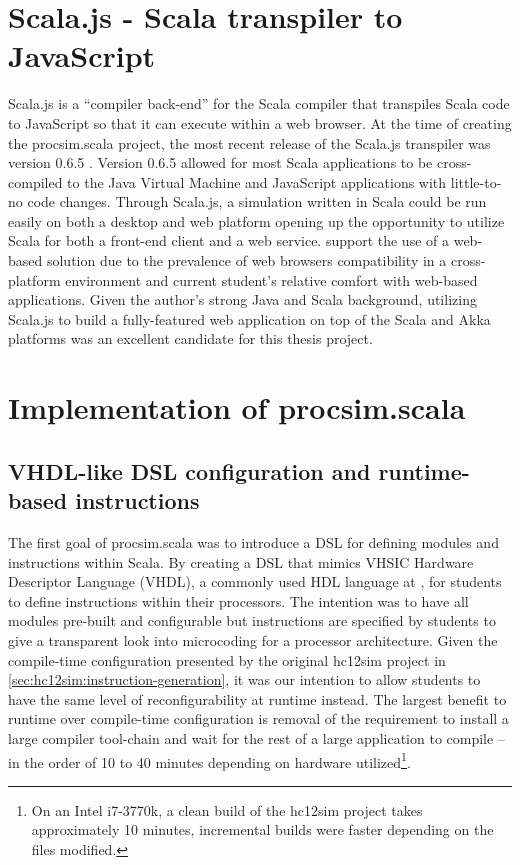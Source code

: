 \section{Scala.js - Scala transpiler to JavaScript}

Scala.js is a ``compiler back-end'' for the Scala compiler that transpiles Scala code to JavaScript so that it can execute within a web browser. At the time of creating the procsim.scala project, the most recent release of the Scala.js transpiler was version 0.6.5 \cite{Scala-js2015}. Version 0.6.5 allowed for most Scala applications to be cross-compiled to the Java Virtual Machine and JavaScript applications with little-to-no code changes. Through Scala.js, a simulation written in Scala could be run easily on both a desktop and web platform opening up the opportunity to utilize Scala for both a front-end client and a web service.  support the use of a web-based solution due to the prevalence of web browsers compatibility in a cross-platform environment and current student's relative comfort with web-based applications. Given the author's strong Java and Scala background, utilizing Scala.js to build a fully-featured web application on top of the Scala and Akka platforms was an excellent candidate for this thesis project.

\section{Implementation of procsim.scala}

\subsection{VHDL-like DSL configuration and runtime-based instructions}
\label{sec:sec:procsim-scala:configuration}

The first goal of procsim.scala was to introduce a DSL for defining modules and instructions within Scala. By creating a DSL that mimics VHSIC Hardware Descriptor Language (VHDL), a commonly used HDL language at \uwo{}, for students to define instructions within their processors. The intention was to have all modules pre-built and configurable but instructions are specified by students to give a transparent look into microcoding for a processor architecture. Given the compile-time configuration presented by the original hc12sim project in \cref{sec:hc12sim:instruction-generation}, it was our intention to allow students to have the same level of reconfigurability at runtime instead. The largest benefit to runtime over compile-time configuration is removal of the requirement to install a large compiler tool-chain and wait for the rest of a large application to compile -- in the order of 10 to 40 minutes depending on hardware utilized\footnote{On an Intel\textregistered{} i7-3770k, a clean build of the hc12sim project takes approximately 10 minutes, incremental builds were faster depending on the files modified.}. 

